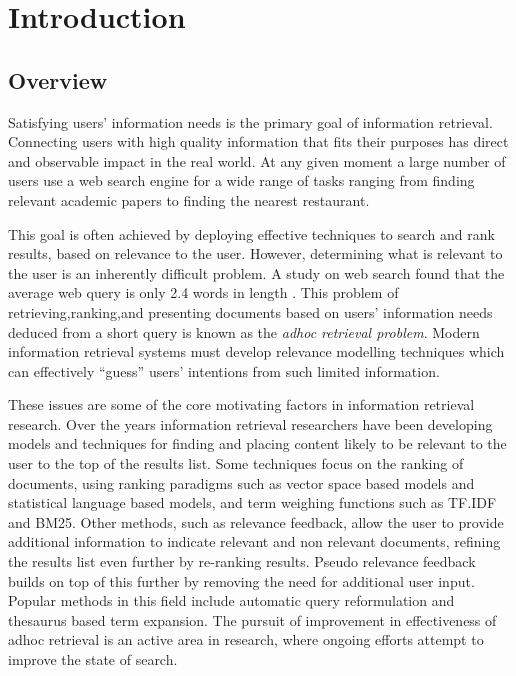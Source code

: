 \chapter{Introduction}
\label{chap:intro}

\section{Overview}

Satisfying users' information needs is the primary goal of information retrieval. Connecting users with high quality information that fits their purposes has direct and observable impact in the real world. At any given moment a large number of users use a web search engine for a wide range of tasks ranging from finding relevant academic papers to finding the nearest restaurant. 

This goal is often achieved by deploying effective techniques to search and rank results, based on relevance to the user. However, determining what is relevant to the user is an inherently difficult problem. A study on web search found that the average web query is only 2.4 words in length \cite{spink2001searching}.  This problem of retrieving,ranking,and presenting documents based on users' information needs deduced from a short query is known as the \textit{adhoc retrieval problem}. Modern information retrieval systems must develop relevance modelling techniques which can effectively ``guess'' users' intentions from such limited information. 

These issues are some of the core motivating factors in information retrieval research.  Over the years information retrieval researchers have been developing models and techniques for finding and placing content likely to be relevant to the user to the top of the results list. Some techniques focus on the ranking of documents, using ranking paradigms such as vector space based models and statistical language based models, and term weighing functions such as TF.IDF\cite{Salton:1975:VSM:361219.361220} and BM25\cite{harman1995overview}. Other methods, such as relevance feedback, allow the user to provide additional information to indicate relevant and non relevant documents, refining the results list even further by re-ranking results. Pseudo relevance feedback builds on top of this further by removing the need for additional user input. Popular methods in this field include automatic query reformulation and thesaurus based term expansion. The pursuit of improvement in effectiveness of adhoc retrieval is an active area in research, where ongoing efforts attempt to improve the state of search.

